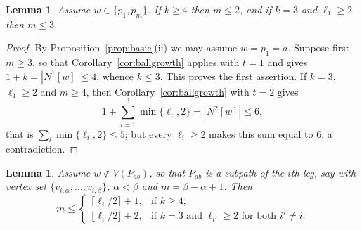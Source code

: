 \documentclass[reqno,10pt]{article}
\newtheorem{lemma}[theorem]{Lemma}
\theoremstyle{definition}
\numberwithin{equation}{section}
\numberwithin{theorem}{section}
\newcommand{\Ball}[2]{N^{#2}[#1]}
\begin{document}
\begin{lemma}
\label{lem:bodyend}
Assume $w\in\{p_1,p_m\}$. If $k\ge4$ then $m\le2$, and if $k=3$ and
$\ell_1\ge2$ then $m\le3$.
\end{lemma}

\begin{proof}
By Proposition~\ref{prop:basic}(ii) we may assume $w=p_1=a$. Suppose first
$m\ge3$, so that Corollary~\ref{cor:ballgrowth} applies with $t=1$ and gives
$1+k=|\Ball{w}{1}|\le4$, whence $k\le3$. This proves the first assertion. If
$k=3$, $\ell_1\ge2$ and $m\ge4$, then Corollary~\ref{cor:ballgrowth} with $t=2$
gives
\[
  1+\sum_{i=1}^{3}\min\{\ell_i,2\}=|\Ball{w}{2}|\le 6 ,
\]
that is $\textstyle\sum_{i}\min\{\ell_i,2\}\le5$; but every $\ell_i\ge2$ makes this sum
equal to $6$, a contradiction.
\end{proof}

\begin{lemma}
\label{lem:oneleg}
Assume $w\notin V(P_{ab})$, so that $P_{ab}$ is a subpath of the $i$th leg,
say with vertex set $\{v_{i,\alpha},\dots,v_{i,\beta}\}$, $\alpha<\beta$ and
$m=\beta-\alpha+1$. Then
\[
  m\le
  \begin{cases}
    \lceil \ell_i/2\rceil+1, & \text{if } k\ge4,\\
    \lfloor \ell_i/2\rfloor+2, & \text{if } k=3 \text{ and } \ell_{i'}\ge2
       \text{ for both } i'\ne i .
  \end{cases}
\]
\end{lemma}
\end{document}
